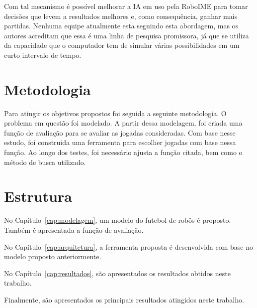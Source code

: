 Com tal mecanismo é possível melhorar a IA em uso pela RoboIME para tomar
decisões que levem a resultados melhores e, como consequência, ganhar mais
partidas.  Nenhuma equipe atualmente esta seguindo esta abordagem, mas os
autores acreditam que essa é uma linha de pesquisa promissora, já que se utiliza
da capacidade que o computador tem de simular várias possibilidades em um curto
intervalo de tempo.

\section{Metodologia}

Para atingir os objetivos propostos foi seguida a seguinte metodologia.
O problema em questão foi modelado. A partir dessa modelagem, foi
criada uma função de avaliação para se avaliar as jogadas consideradas.
Com base nesse estudo, foi construida uma ferramenta para escolher
jogadas com base nessa função. Ao longo dos testes, foi necessário
ajusta a função citada, bem como o método de busca utilizado.

\section{Estrutura}

No Capítulo~\ref{cap:modelagem}, um modelo do futebol de robôs é proposto.
Também é apresentada a função de avaliação.

No Capítulo~\ref{cap:arquitetura}, a ferramenta proposta é desenvolvida com
base no modelo proposto anteriormente.

No Capítulo~\ref{cap:resultados}, são apresentados os resultados obtidos
neste trabalho.


Finalmente, são apresentados os principais resultados atingidos neste trabalho.

